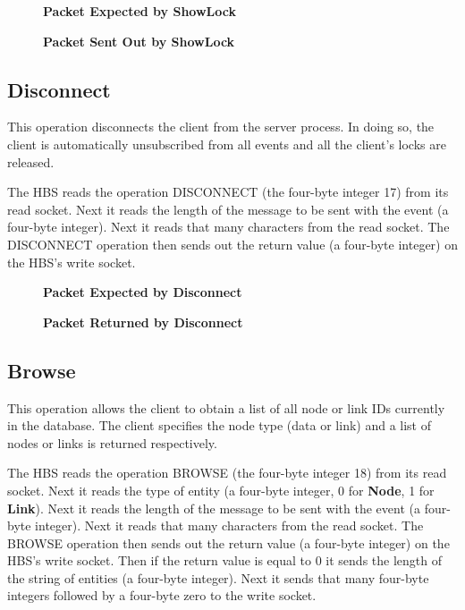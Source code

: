 \begin{figure}[htb]
  \centerline{}
  \caption{{\bf Packet Expected by ShowLock}}
  \label{fig:ShowLock1}
\end{figure}

\begin{figure}[htb]
  \centerline{}
  \caption{{\bf Packet Sent Out by ShowLock}}
  \label{fig:ShowLock2}
\end{figure}


\newpage
\subsection{Disconnect}

This operation disconnects the client from the server process.  In doing so,
the client is automatically unsubscribed from all events and all the client's
locks are released.  

The HBS reads the operation DISCONNECT (the four-byte integer 17) from its
read socket.  Next it reads the length of the message to be sent with
the event (a four-byte integer).  Next it reads that many characters from
the read socket.  The DISCONNECT operation then sends out the return
value (a four-byte integer) on the HBS's write socket.

\begin{figure}[htb]
  \centerline{}
  \caption{{\bf Packet Expected by Disconnect}}
  \label{fig:Disconnect1}
\end{figure}


\begin{figure}[htb]
  \centerline{}
  \caption{{\bf Packet Returned by Disconnect}}
  \label{fig:Disconnect2}
\end{figure}


\newpage
\subsection{Browse}

This operation allows the client to obtain a list of all node or link IDs
currently in the database.  The client specifies the node type (data or
link) and a list of nodes or links is returned respectively.  

The HBS reads the operation BROWSE (the four-byte integer 18) from its read
socket.  Next it reads the type of entity (a four-byte integer, 0 for {\bf
Node}, 1 for {\bf Link}).  Next it reads the length of the message to
be sent with the event (a four-byte integer).  Next it reads that many
characters from the read socket.  The BROWSE operation then sends out
the return value (a four-byte integer) on the HBS's write socket.  Then if
the return value is equal to 0 it sends the length of the string of
entities (a four-byte integer).  Next it sends that many four-byte integers
followed by a four-byte zero to the write socket.

